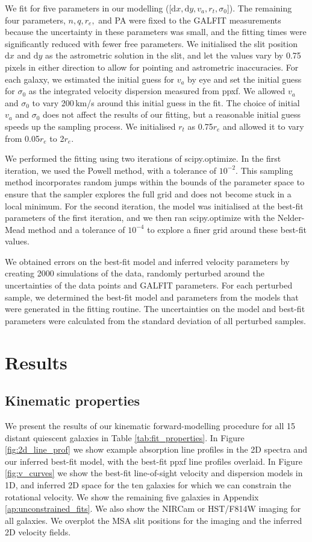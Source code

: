 \documentclass{aa}
\newcommand{\dd}{\ensuremath{\mathrm{d}}}
\begin{document}
We fit for five parameters in our modelling ([$\dd x, \dd y, v_a, r_t, \sigma_0$]). The remaining four parameters, $n, q, r_e,$ and PA were fixed to the {\sc GALFIT} measurements because the uncertainty in these parameters was small, and the fitting times were significantly reduced with fewer free parameters. We initialised the slit position $\dd x$ and $\dd y$ as the astrometric solution in the slit, and let the values vary by 0.75 pixels in either direction to allow for pointing and astrometric inaccuracies. For each galaxy, we estimated the initial guess for $v_a$ by eye and set the initial guess for $\sigma_0$ as the integrated velocity dispersion measured from {\sc ppxf}. We allowed $v_a$ and $\sigma_0$ to vary 200\,km/s around this initial guess in the fit. The choice of initial $v_a$ and $\sigma_0$ does not affect the results of our fitting, but a reasonable initial guess speeds up the sampling process. We initialised $r_t$ as 0.75$r_e$ and allowed it to vary from 0.05$r_e$ to 2$r_e$.

We performed the fitting using two iterations of {\sc scipy.optimize}. In the first iteration, we used the Powell method, with a tolerance of $10^{-2}$. This sampling method incorporates random jumps within the bounds of the parameter space to ensure that the sampler explores the full grid and does not become stuck in a local minimum. For the second iteration, the model was initialised at the best-fit parameters of the first iteration, and we then ran {\sc scipy.optimize} with the Nelder-Mead method and a tolerance of $10^{-4}$ to explore a finer grid around these best-fit values. 

We obtained errors on the best-fit model and inferred velocity parameters by creating 2000 simulations of the data, randomly perturbed around the uncertainties of the data points and GALFIT parameters. For each perturbed sample, we determined the best-fit model and parameters from the models that were generated in the fitting routine. The uncertainties on the model and best-fit parameters were calculated from the standard deviation of all perturbed samples.

\section{Results}\label{sec:results}
\subsection{Kinematic properties}
We present the results of our kinematic forward-modelling procedure for all 15 distant quiescent galaxies in Table \ref{tab:fit_properties}. In Figure \ref{fig:2d_line_prof} we show example absorption line profiles in the 2D spectra and our inferred best-fit model, with the best-fit {\sc ppxf} line profiles overlaid. In Figure \ref{fig:v_curves} we show the best-fit line-of-sight velocity and dispersion models in 1D, and inferred 2D space for the ten galaxies for which we can constrain the rotational velocity. We show the remaining five galaxies in Appendix \ref{ap:unconstrained_fits}. We also show the NIRCam or HST/F814W imaging for all galaxies. We overplot the MSA slit positions for the imaging and the inferred 2D velocity fields.
\end{document}
